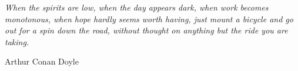 \backmatter

\normalfont

\cleartooddpage

\pagestyle{empty}

\begin{table}[b!]
\begin{center}
\textit{When the spirits are low, when the day appears dark, when work becomes monotonous, when hope hardly seems worth having, just mount a bicycle and go out for a spin down the road, without thought on anything but the ride you are taking.}
\end{center}
\begin{flushright}
Arthur Conan Doyle\\
\end{flushright}
\end{table}